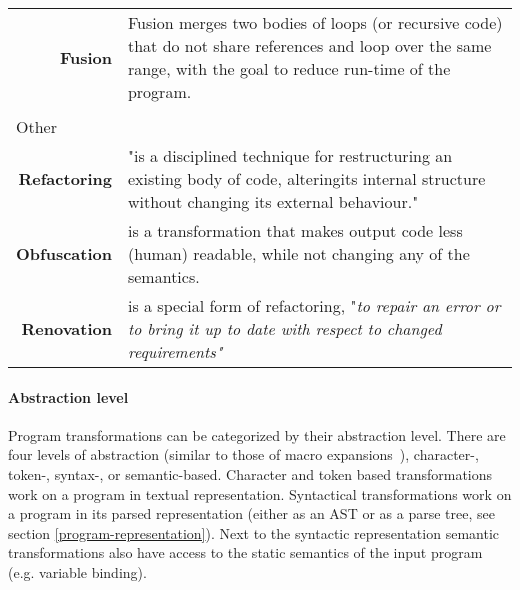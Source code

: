 \begin{table}[h]
\begin{tabular}{p{0.2\linewidth}p{0.8\linewidth}}
\multicolumn{1}{r}{\bf Fusion}                      & Fusion merges two bodies of loops (or recursive code) that do not share references and loop over the same range, with the goal to reduce run-time of the program.                                                                                                                                                                               \\
\\
\multicolumn{1}{l}{Other}         &                                                                                                                                                                               \\
\multicolumn{1}{r}{\bf Refactoring}                 & "is a disciplined technique for restructuring an existing body of code, alteringits internal structure without changing its external behaviour."\footnotemark                 \\
\multicolumn{1}{r}{\bf Obfuscation}                 & is a transformation that makes output code less (human) readable, while not changing any of the semantics.                                                                    \\
\multicolumn{1}{r}{\bf Renovation}                  & is a special form of refactoring, "\textit{to repair an error or to bring it up to date with respect to changed requirements"}~\cite{Visser2001}                                                
\end{tabular}
\end{table}

\paragraph{Abstraction level}
Program transformations can be categorized by their abstraction level. There are four levels of abstraction (similar to those of macro expansions~\cite{Weise1993}), character-, token-, syntax-, or semantic-based. Character and token based transformations work on a program in textual representation. Syntactical transformations work on a program in its parsed representation (either as an AST or as a parse tree, see section \ref{program-representation}). Next to the syntactic representation semantic transformations also have access to the static semantics of the input program (e.g. variable binding).


